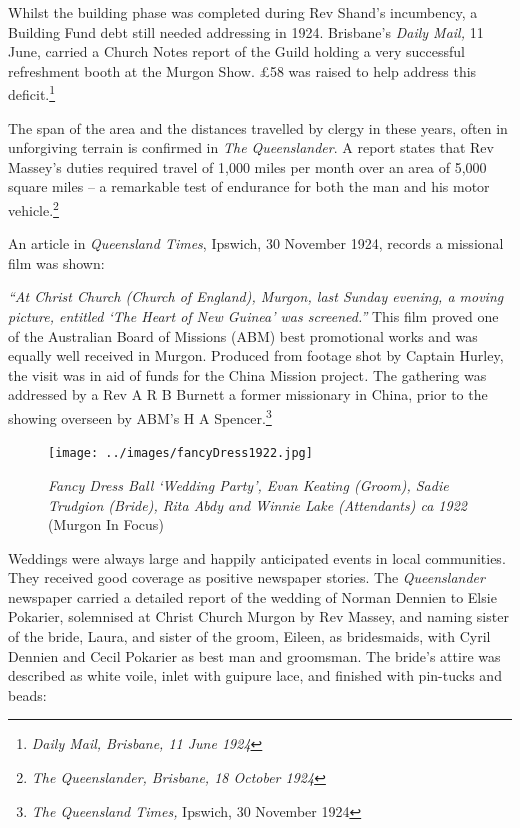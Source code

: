 Whilst the building phase was completed during Rev Shand's incumbency, a Building Fund debt still needed addressing in 1924. Brisbane's \emph{Daily Mail,} 11 June, carried a Church Notes report of the Guild holding a very successful refreshment booth at the Murgon Show. \pounds58 was raised to help address this deficit.\footnote{\emph{Daily Mail, Brisbane, 11 June 1924}}


The span of the area and the distances travelled by clergy in these years, often in unforgiving terrain is confirmed in \emph{The Queenslander}. A report states that Rev Massey's duties required travel of 1,000 miles per month over an area of 5,000 square miles -- a remarkable test of endurance for both the man and his motor vehicle.\footnote{\emph{The Queenslander, Brisbane, 18 October 1924}}


An article in \emph{Queensland Times}, Ipswich, 30 November 1924, records a missional film was shown:



\emph{``At Christ Church (Church of England), Murgon, last Sunday evening, a moving picture, entitled `The Heart of New Guinea' was screened.''} This film proved one of the Australian Board of Missions (ABM) best promotional works and was equally well received in Murgon. Produced from footage shot by Captain Hurley, the visit was in aid of funds for the China Mission project\emph{.} The gathering was addressed by a Rev A R B Burnett a former missionary in China, prior to the showing overseen by ABM's H A Spencer.\footnote{\emph{The Queensland Times,} Ipswich, 30 November 1924}








\begin{figure}[htb]
\begin{center}
\texttt{[image: ../images/fancyDress1922.jpg]}
\caption{{\itshape Fancy Dress Ball `Wedding Party', Evan Keating (Groom), Sadie Trudgion (Bride), Rita Abdy and Winnie Lake (Attendants) ca 1922} {\scriptsize(Murgon In Focus)}}
\end{center}
\end{figure}


Weddings were always large and happily anticipated events in local communities. They received good coverage as positive newspaper stories. The \emph{Queenslander} newspaper carried a detailed report of the wedding of Norman Dennien to Elsie Pokarier, solemnised at Christ Church Murgon by Rev Massey, and naming sister of the bride, Laura, and sister of the groom, Eileen, as bridesmaids, with Cyril Dennien and Cecil Pokarier as best man and groomsman. The bride's attire was described as white voile, inlet with guipure lace, and finished with pin-tucks and beads:



